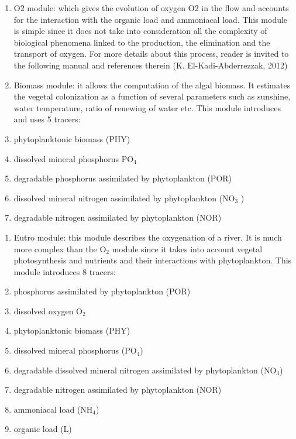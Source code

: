 \documentclass{article} %
\begin{document}
\begin{enumerate}
\item  O2 module:  which gives the evolution of oxygen O2 in the flow and accounts for the interaction with the organic load and ammoniacal load. This module is simple since it does not take into consideration all the complexity of biological phenomena linked to the production, the elimination and the transport of oxygen. For more details about this process, reader is invited to the following manual and references therein (K. El-Kadi-Abderrezzak, 2012)

\item  Biomass module:  it allows the computation of the algal biomass. It estimates the vegetal colonization as a function of several parameters such as sunshine, water temperature, ratio of renewing of water etc. This module introduces and uses 5 tracers:

\item  phytoplanktonic biomass (PHY)

\item  dissolved mineral phosphorus PO${}_{4}$

\item  degradable phosphorus assimilated by phytoplankton (POR)

\item  dissolved mineral nitrogen assimilated by phytoplankton (NO${}_{3}$ )

\item  degradable nitrogen assimilated by phytoplankton (NOR)
\end{enumerate}



\begin{enumerate}
\item  Eutro module:  this module describes the oxygenation of a river. It is much more complex than the O${}_{2}$ module since it takes into account vegetal photosynthesis and nutrients and their interactions with phytoplankton. This module introduces 8 tracers:

\item  phosphorus assimilated by phytoplankton (POR)

\item  dissolved oxygen O${}_{2}$

\item  phytoplanktonic biomass (PHY)

\item  dissolved mineral phosphorus (PO${}_{4}$)

\item  degradable dissolved mineral nitrogen assimilated by phytoplankton (NO${}_{3}$)

\item  degradable nitrogen assimilated by phytoplankton (NOR)

\item  ammoniacal load (NH${}_{4}$)

\item  organic load (L)
\end{enumerate}
\end{document}
